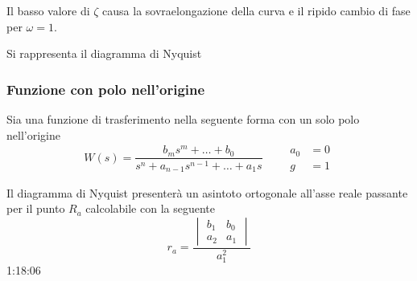 Il basso valore di $\zeta$ causa la sovraelongazione della curva e il ripido
cambio di fase per $\omega=1$.

\newpage
Si rappresenta il diagramma di Nyquist
\begin{figure}[h]
\centering
{}
\end{figure}

\subsubsection{Funzione con polo nell'origine}
Sia una funzione di trasferimento nella seguente forma con un solo polo
nell'origine
$$
W(s) = \frac{b_ms^m + \ldots + b_0}{s^n+a_{n-1}s^{n-1} + \ldots + a_1s}\qquad
\begin{aligned}
a_0 &= 0\\
g &= 1
\end{aligned}
$$

Il diagramma di Nyquist presenterà un asintoto
ortogonale all'asse reale passante per il punto $R_a$ calcolabile con la
seguente
$$
r_a = \frac{
\begin{vmatrix}
b_1 & b_0 \\
a_2 & a_1
\end{vmatrix}
}
{a_1^2}
$$
1:18:06
